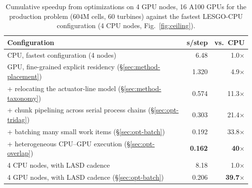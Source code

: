\begin{table}[h]
    \vspace{-0.05in}
\centering
\caption{Cumulative speedup from optimizations on 4 GPU nodes, 16 A100 GPUs for the
production problem (604M cells, 60 turbines) against the fastest
LESGO-CPU configuration (4 CPU nodes, Fig.~\ref{fig:ceiling}).}
\label{tab:cumulative}
\footnotesize
\setlength{\tabcolsep}{4pt}
\begin{tabular}{@{}lrr@{}}
\toprule
Configuration & s/step & vs.\ CPU \\
\midrule
CPU, fastest configuration (4 nodes)  & 6.48 & 1.0$\times$ \\
GPU, fine-grained explicit residency (\S\ref{sec:method-placement})
                                        & 1.320 & 4.9$\times$ \\
\;+ relocating the actuator-line model (\S\ref{sec:method-taxonomy})
                                       & 0.574 & 11.3$\times$ \\
\;+ chunk pipelining across serial process chains (\S\ref{sec:opt-tridag})
                                       & 0.303 & 21.4$\times$ \\
\;+ batching many small work items (\S\ref{sec:opt-batch})
                                       & 0.192 & 33.8$\times$ \\
\;+ heterogeneous CPU--GPU execution (\S\ref{sec:opt-overlap})
                                       & \textbf{0.162} & \textbf{40$\times$} \\
\midrule
4 CPU nodes, with LASD cadence       & 8.18 & 1.0$\times$ \\
4 GPU nodes, with LASD cadence (\S\ref{sec:opt-batch})
                                        & 0.206 & \textbf{39.7$\times$} \\
\bottomrule
\end{tabular}
\vspace{-0.05in}
\end{table}

